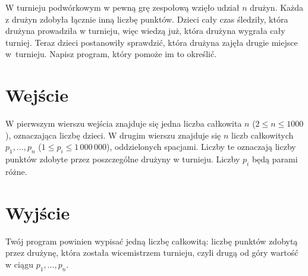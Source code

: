\documentclass{spiral-kurs}
\begin{document}
\makeheader
%
    W turnieju podwórkowym w pewną grę zespołową wzięło udział $n$ drużyn.
    Każda z drużyn zdobyła łącznie inną liczbę punktów.
    Dzieci cały czas śledziły, która drużyna prowadziła w turnieju, więc
    wiedzą już, która drużyna wygrała cały turniej.
    Teraz dzieci postanowiły sprawdzić, która drużyna zajęła drugie miejsce
    w~turnieju.
    Napisz program, który pomoże im to określić.

    \section{Wejście}
    W pierwszym wierszu wejścia znajduje się jedna liczba całkowita $n$
    ($2 \le n \le 1000$), oznaczająca liczbę dzieci.
    W drugim wierszu znajduje się $n$ liczb całkowitych $p_1,\ldots,p_n$
    ($1 \le p_i \le 1\,000\,000$), oddzielonych spacjami.
    Liczby te oznaczają liczby punktów zdobyte przez poszczególne drużyny w turnieju.
    Liczby $p_i$ będą parami różne.

    \section{Wyjście}
    Twój program powinien wypisać jedną liczbę całkowitą: liczbę punktów zdobytą
    przez drużynę, która została wicemistrzem turnieju, czyli drugą od góry wartość
    w ciągu $p_1,\ldots,p_n$.



  
\end{document}
